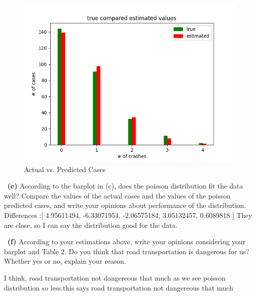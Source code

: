 \documentclass[a4 paper]{article}
\numberwithin{equation}{section}
\newcommand{\subproblem}[1]{~\newline\textbf{(#1)}}
\newcommand{\0}{\mathbf{0}}
\begin{document}
\begin{figure}[h!]
    \centering
    \includegraphics[scale=0.6]{plot.png}
    \caption{Actual vs. Predicted Cases}
    \label{fig:barplot}
\end{figure}

\subproblem{e} According to the barplot in (c), does the poisson distribution fit the data well? Compare the values of the actual cases and the values of the poisson predicted cases, and write your opinions about performance of the distribution.\\

Differences :[ 4.95611494, -6.33071954, -2.06575184,  3.05132457,  0.6089818 ] They are close, so I can say the distribution good for the data.

\subproblem{f} According to your estimations above, write your opinions considering your barplot and Table 2. Do you
think that road transportation is dangerous for us? Whether yes or no, explain your reason.

I think, road transportation not dangereous that much as we see poisson distribution so less.this says road transportation not dangereous that much
\end{document}
